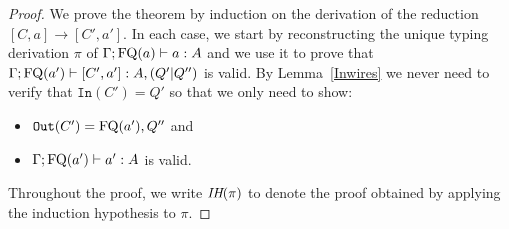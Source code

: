 \documentclass[twoside]{article}
\begin{document}
\begin{proof}
We prove the theorem by induction on the derivation of the reduction 
 $[C,a]\to[C',a']$. In each case, we start by reconstructing 
the unique typing derivation $\pi$ of $\Gamma;\mathop{\textrm{FQ}}\nolimits(a)\vdash a:A$ and we use 
it to prove that $\Gamma;\mathop{\textrm{FQ}}\nolimits(a')\vdash [C',a']:A,(Q'|Q'')$ is valid. 
By Lemma~\hyperref[Inwires]{\ref*{Inwires}} we never need to 
verify that $\mathtt{In}(C')=Q'$ so that we only need to show:
\begin{itemize}
  \item $\mathtt{Out}(C')=\mathop{\textrm{FQ}}\nolimits(a'),Q''$ and
  \item $\Gamma;\mathop{\textrm{FQ}}\nolimits(a')\vdash a':A$ is valid.
\end{itemize}
Throughout the proof, we write $\textit{IH}(\pi)$ to denote the proof obtained by applying 
the induction hypothesis to $\pi$.


\end{proof}
\end{document}
